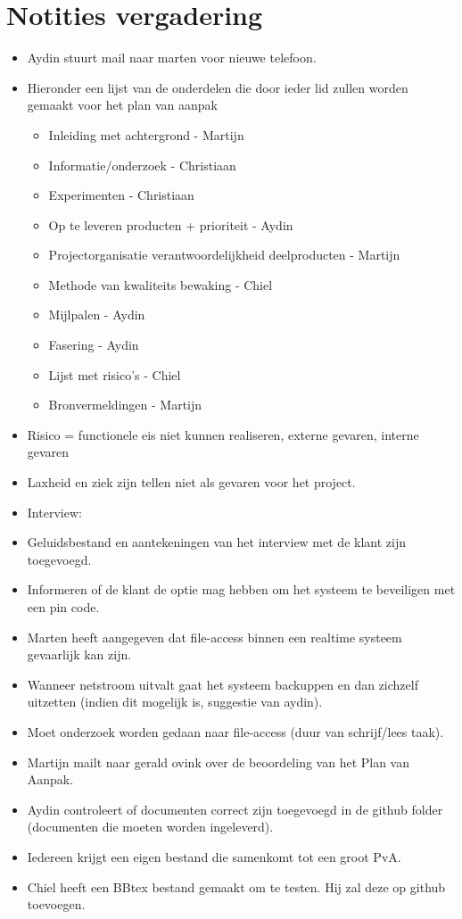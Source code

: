 \documentclass[dutch]{hu}
\begin{document}
\section{Notities vergadering}
\begin{itemize}
\item Aydin stuurt mail naar marten voor nieuwe telefoon.
\item Hieronder een lijst van de onderdelen die door ieder lid zullen worden gemaakt voor het plan van aanpak
\begin{itemize}[labelindent=1cm]
\item Inleiding met achtergrond - Martijn
\item Informatie/onderzoek - Christiaan
\item Experimenten - Christiaan
\item Op te leveren producten + prioriteit - Aydin
\item Projectorganisatie verantwoordelijkheid deelproducten - Martijn
\item Methode van kwaliteits bewaking - Chiel
\item Mijlpalen - Aydin
\item Fasering - Aydin
\item Lijst met risico's - Chiel
\item Bronvermeldingen - Martijn
\end{itemize}

\item Risico = functionele eis niet kunnen realiseren, externe gevaren, interne gevaren
\item Laxheid en ziek zijn tellen niet als gevaren voor het project.
\item Interview: 
\item Geluidsbestand en aantekeningen van het interview met de klant zijn toegevoegd.
\item Informeren of de klant de optie mag hebben om het systeem te beveiligen met een pin code.
\item Marten heeft aangegeven dat file-access binnen een realtime systeem gevaarlijk kan zijn.
\item Wanneer netstroom uitvalt gaat het systeem backuppen en dan zichzelf uitzetten (indien dit mogelijk is, suggestie van aydin).
\item Moet onderzoek worden gedaan naar file-access (duur van schrijf/lees taak).
\item Martijn mailt naar gerald ovink over de beoordeling van het Plan van Aanpak.
\item Aydin controleert of documenten correct zijn toegevoegd in de github folder (documenten die moeten worden ingeleverd).
\item Iedereen krijgt een eigen bestand die samenkomt tot een groot PvA.
\item Chiel heeft een BBtex bestand gemaakt om te testen. Hij zal deze op github toevoegen.

\end{itemize}
\end{document}
